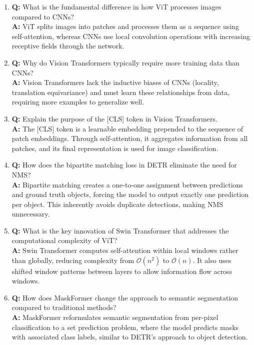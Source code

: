 \begin{enumerate}
    \item \textbf{Q:} What is the fundamental difference in how ViT processes images compared to CNNs?\\
    \textbf{A:} ViT splits images into patches and processes them as a sequence using self-attention, whereas CNNs use local convolution operations with increasing receptive fields through the network.

    \item \textbf{Q:} Why do Vision Transformers typically require more training data than CNNs?\\
    \textbf{A:} Vision Transformers lack the inductive biases of CNNs (locality, translation equivariance) and must learn these relationships from data, requiring more examples to generalize well.

    \item \textbf{Q:} Explain the purpose of the [CLS] token in Vision Transformers.\\
    \textbf{A:} The [CLS] token is a learnable embedding prepended to the sequence of patch embeddings. Through self-attention, it aggregates information from all patches, and its final representation is used for image classification.

    \item \textbf{Q:} How does the bipartite matching loss in DETR eliminate the need for NMS?\\
    \textbf{A:} Bipartite matching creates a one-to-one assignment between predictions and ground truth objects, forcing the model to output exactly one prediction per object. This inherently avoids duplicate detections, making NMS unnecessary.

    \item \textbf{Q:} What is the key innovation of Swin Transformer that addresses the computational complexity of ViT?\\
    \textbf{A:} Swin Transformer computes self-attention within local windows rather than globally, reducing complexity from $\mathcal{O}(n^2)$ to $\mathcal{O}(n)$. It also uses shifted window patterns between layers to allow information flow across windows.

    \item \textbf{Q:} How does MaskFormer change the approach to semantic segmentation compared to traditional methods?\\
    \textbf{A:} MaskFormer reformulates semantic segmentation from per-pixel classification to a set prediction problem, where the model predicts masks with associated class labels, similar to DETR's approach to object detection.
\end{enumerate}
